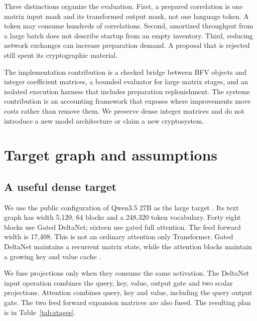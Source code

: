 \documentclass[10pt,twocolumn]{article}
\begin{document}
Three distinctions organize the evaluation. First, a prepared correlation is
one matrix input mask and its transformed output mask, not one language token.
A token may consume hundreds of correlations. Second, amortized throughput
from a large batch does not describe startup from an empty inventory. Third,
reducing network exchanges can increase preparation demand. A proposal that
is rejected still spent its cryptographic material.

The implementation contribution is a checked bridge between BFV objects and
integer coefficient matrices, a bounded evaluator for large matrix stages, and
an isolated execution harness that includes preparation replenishment. The
systems contribution is an accounting framework that exposes where improvements
move costs rather than remove them. We preserve dense integer matrices and do
not introduce a new model architecture or claim a new cryptosystem.

\section{Target graph and assumptions}
\subsection{A useful dense target}
We use the public configuration of Qwen3.5 27B as the large target
\cite{qwenconfig,qwencode}. Its text graph has width 5,120, 64 blocks and a
248,320 token vocabulary. Forty eight blocks use Gated DeltaNet; sixteen use
gated full attention. The feed forward width is 17,408. This is not an ordinary
attention only Transformer. Gated DeltaNet maintains a recurrent matrix state,
while the attention blocks maintain a growing key and value cache
\cite{gateddelta}.

We fuse projections only when they consume the same activation. The DeltaNet
input operation combines the query, key, value, output gate and two scalar
projections. Attention combines query, key and value, including the query output
gate. The two feed forward expansion matrices are also fused. The resulting
plan is in Table~\ref{tab:stages}.
\end{document}
